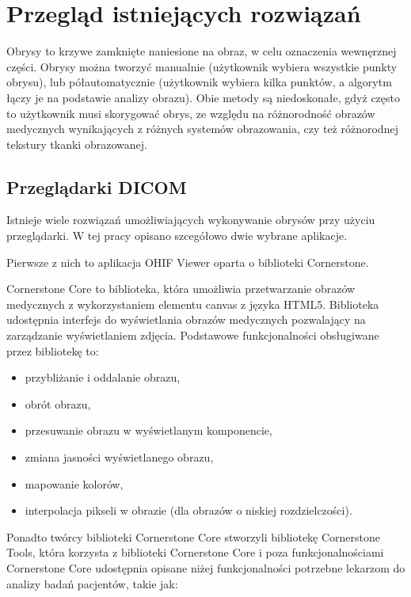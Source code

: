 \documentclass[a4paper,11pt,twoside,openright]{report}
\theoremstyle{definition}
\begin{document}
\section {Przegląd istniejących rozwiązań}

Obrysy to krzywe zamknięte naniesione na obraz, w celu oznaczenia wewnęrznej części.
Obrysy można tworzyć manualnie (użytkownik wybiera wszystkie punkty obrysu), lub
półautomatycznie (użytkownik wybiera kilka punktów, a algorytm łączy je na podstawie
analizy obrazu). Obie metody są niedoskonałe, gdyż często to użytkownik musi skorygować
obrys, ze względu na różnorodność obrazów medycznych wynikających z różnych systemów
obrazowania, czy też różnorodnej tekstury tkanki obrazowanej.

\subsection {Przeglądarki DICOM}

Istnieje wiele rozwiązań umożliwiających wykonywanie obrysów przy użyciu przeglądarki.
W tej pracy opisano szcegółowo dwie wybrane aplikacje.

Pierwsze z nich to aplikacja OHIF Viewer oparta o biblioteki Cornerstone.

Cornerstone Core \cite{Cornerstone Core} to biblioteka, która umożliwia przetwarzanie
obrazów medycznych z wykorzystaniem elementu canvas z języka HTML5. Biblioteka
udostępnia interfejs do wyświetlania obrazów medycznych pozwalający na zarządzanie
wyświetlaniem zdjęcia. Podstawowe funkcjonalności obsługiwane przez bibliotekę to:

\begin{itemize}[noitemsep]
\item przybliżanie i oddalanie obrazu,
\item obrót obrazu,
\item przesuwanie obrazu w wyświetlanym komponencie,
\item zmiana jasności wyświetlanego obrazu,
\item mapowanie kolorów,
\item interpolacja pikseli w obrazie (dla obrazów o niskiej rozdzielczości).
\end{itemize}

Ponadto twórcy biblioteki Cornerstone Core stworzyli bibliotekę Cornerstone Tools,
która korzysta z biblioteki Cornerstone Core i poza funkcjonalnościami
Cornerstone Core udostępnia opisane niżej funkcjonalności
potrzebne lekarzom do analizy badań pacjentów, takie jak:
\end{document}
